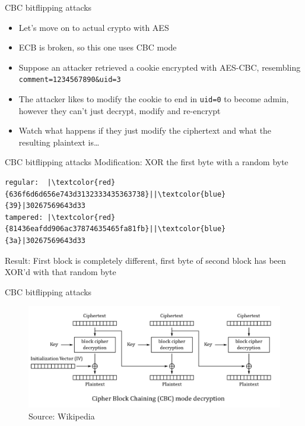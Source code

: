 \documentclass[presentation]{beamer}
\begin{document}
\begin{frame}[fragile,label=sec-2-16]{CBC bitflipping attacks}
 \begin{itemize}
\item Let's move on to actual crypto with AES
\item ECB is broken, so this one uses CBC mode
\item Suppose an attacker retrieved a cookie encrypted with AES-CBC,
resembling \verb~comment=1234567890&uid=3~
\item The attacker likes to modify the cookie to end in \verb~uid=0~ to become
admin, however they can't just decrypt, modify and re-encrypt
\item Watch what happens if they just modify the ciphertext and what the
resulting plaintext is\ldots{}
\end{itemize}
\end{frame}

\begin{frame}[fragile,label=sec-2-17]{CBC bitflipping attacks}
 Modification: XOR the first byte with a random byte

\begin{verbatim}
regular:  |\textcolor{red}{636f6d6d656e743d3132333435363738}||\textcolor{blue}{39}|30267569643d33
tampered: |\textcolor{red}{81436eafdd906ac37874635465fa81fb}||\textcolor{blue}{3a}|30267569643d33
\end{verbatim}

Result: First block is completely different, first byte of second
block has been XOR'd with that random byte
\end{frame}

\begin{frame}[label=sec-2-18]{CBC bitflipping attacks}
\begin{figure}[htb]
\centering
\includegraphics[width=.9\linewidth]{./img/cbc_decryption.png}
\caption{Source: Wikipedia}
\end{figure}
\end{frame}
\end{document}
